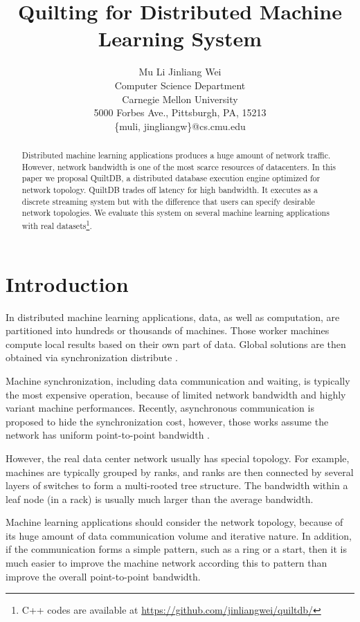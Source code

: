 \documentclass[11pt, twocolumn]{article}
\title{Quilting for Distributed Machine Learning System}
\author{Mu Li \quad Jinliang Wei\\ Computer Science Department
  \\Carnegie Mellon University\\
  5000 Forbes Ave., Pittsburgh, PA, 15213\\
\{muli, jingliangw\}@cs.cmu.edu}
\begin{document}
\maketitle

\begin{abstract}
  Distributed machine learning applications produces a huge amount of network
  traffic. However, network bandwidth is one of the most scarce resources of
  datacenters.  In this paper we proposal QuiltDB, a distributed database
  execution engine optimized for network topology. QuiltDB trades off latency
  for high bandwidth. It executes as a discrete streaming system but with the
  difference that
  users can specify desirable network topologies. We evaluate this system on
  several machine learning applications with real datasets\footnote{C++ codes
    are available at \url{https://github.com/jinliangwei/quiltdb/}}.
\end{abstract}

\section{Introduction}

In distributed machine learning applications, data,  as well as computation, are
partitioned into hundreds or  thousands of machines. Those
worker machines compute local results based on their own part of data. Global solutions
are then obtained via synchronization distribute \cite{AhmSheNarJosSmo13,
  HoCipCuiLeeetal13,Lietal13,DeaCorMonCheetal12,GonLowGuBicetal12,CheSonBaiLinetal11}.

Machine synchronization, including data communication and waiting, is typically
the most expensive operation, because of limited network bandwidth and highly
variant machine performances. Recently, asynchronous communication is proposed
to hide the synchronization cost, however, those works assume the network has
uniform point-to-point bandwidth \cite{AsuSmyWel08,SmoNar10,AhmSheNarJosSmo13,Lietal13}.

However, the real data center network usually has special topology. For
example, machines are typically grouped by ranks, and ranks are then connected by
several layers of switches to form a multi-rooted tree structure. The bandwidth
within a leaf node (in a rack) is usually much larger than the average
bandwidth.

Machine learning applications should consider the network topology, because of
its huge amount of data communication volume and iterative nature. In addition,
if the communication forms a simple pattern, such as a ring or a start, then it
is much easier to improve the machine network according this to pattern than
improve the overall point-to-point bandwidth.
\end{document}
